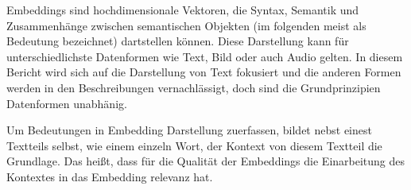\documentclass[../main.tex]{subfiles}
\begin{document}
Embeddings sind hochdimensionale Vektoren, die Syntax, Semantik und Zusammenhänge zwischen semantischen Objekten (im folgenden meist als Bedeutung bezeichnet) dartstellen können.
Diese Darstellung kann für unterschiedlichste Datenformen wie Text, Bild oder auch Audio gelten.
\cite{mikolov2013efficient}
In diesem Bericht wird sich auf die Darstellung von Text fokusiert und die anderen Formen werden in den Beschreibungen vernachlässigt, doch sind die Grundprinzipien Datenformen unabhänig.

Um Bedeutungen in Embedding Darstellung zuerfassen, bildet nebst einest Textteils selbst, wie einem einzeln Wort, der Kontext von diesem Textteil die Grundlage.
\cite{rubenstein1965contextual}
Das heißt, dass für die Qualität der Embeddings die Einarbeitung des Kontextes in das Embedding relevanz hat.
\cite{huang-etal-2012-improving}
\end{document}
